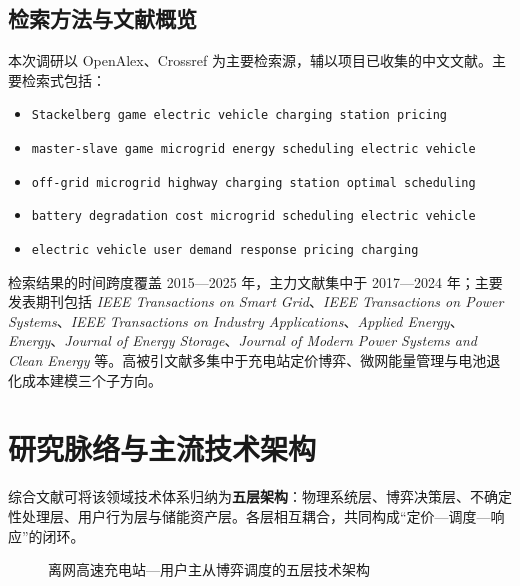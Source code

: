\documentclass[UTF8,a4paper,11pt]{ctexart}
\begin{document}
\subsection{检索方法与文献概览}
本次调研以 OpenAlex、Crossref 为主要检索源，辅以项目已收集的中文文献。主要检索式包括：
\begin{itemize}
  \item \texttt{Stackelberg game electric vehicle charging station pricing}
  \item \texttt{master-slave game microgrid energy scheduling electric vehicle}
  \item \texttt{off-grid microgrid highway charging station optimal scheduling}
  \item \texttt{battery degradation cost microgrid scheduling electric vehicle}
  \item \texttt{electric vehicle user demand response pricing charging}
\end{itemize}
检索结果的时间跨度覆盖 2015—2025 年，主力文献集中于 2017—2024 年；主要发表期刊包括 \textit{IEEE Transactions on Smart Grid}、\textit{IEEE Transactions on Power Systems}、\textit{IEEE Transactions on Industry Applications}、\textit{Applied Energy}、\textit{Energy}、\textit{Journal of Energy Storage}、\textit{Journal of Modern Power Systems and Clean Energy} 等。高被引文献多集中于充电站定价博弈、微网能量管理与电池退化成本建模三个子方向。

\section{研究脉络与主流技术架构}

综合文献可将该领域技术体系归纳为\textbf{五层架构}：物理系统层、博弈决策层、不确定性处理层、用户行为层与储能资产层。各层相互耦合，共同构成“定价—调度—响应”的闭环。

\begin{figure}[htbp]
\centering
{}
\caption{离网高速充电站—用户主从博弈调度的五层技术架构}
\end{figure}
\end{document}
